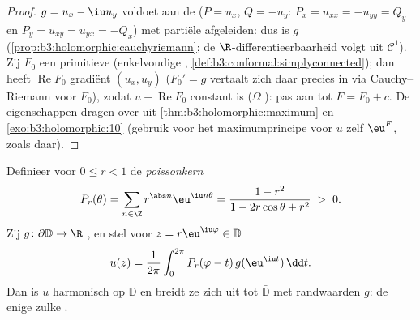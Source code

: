 \begin{proof}
$g = u_x - \iu u_y$ voldoet aan de  ($P = u_x$, $Q = -u_y$: $P_x = u_{xx} = -u_{yy} =
Q_y$ en $P_y = u_{xy} = u_{yx} = -Q_x$) met  partiële
afgeleiden: dus is $g$ 
(\cref{prop:b3:holomorphic:cauchyriemann}; de
$\R$-differentieerbaarheid volgt uit $\mathcal C^1$). Zij $F_0$
een primitieve (enkelvoudige ,
\cref{def:b3:conformal:simplyconnected}); dan heeft
$\operatorname{Re}F_0$ gradiënt $(u_x, u_y)$ ($F_0' = g$ vertaalt
zich daar precies in via Cauchy--Riemann voor $F_0$), zodat $u -
\operatorname{Re}F_0$ constant is ($\Omega$ ): pas
aan tot $F = F_0 + c$. De eigenschappen dragen over uit
\cref{thm:b3:holomorphic:maximum} en
\cref{exo:b3:holomorphic:10} (gebruik voor het maximumprincipe
voor $u$ zelf $\eu^{F}$, zoals daar).
\end{proof}

\begin{theorem}\label{thm:b3:conformal:poisson}
Definieer voor $0 \leq r < 1$ de
\emph{poissonkern}
\[
P_r(\theta) = \sum_{n\in\Z}r^{\abs n}\eu^{\iu n\theta}
= \frac{1 - r^2}{1 - 2r\cos\theta + r^2} \;>\; 0 .
\]
Zij $g \colon \partial\mathbb D \to \R$ , en stel voor $z
= r\eu^{\iu\varphi} \in \mathbb D$
\[
u(z) = \frac1{2\pi}\int_0^{2\pi}
P_r(\varphi - t)\,g(\eu^{\iu t})\,\dd t .
\]
Dan is $u$ harmonisch op $\mathbb D$ en breidt ze zich 
uit tot $\bar{\mathbb D}$ met randwaarden $g$: de enige zulke
.
\end{theorem}

